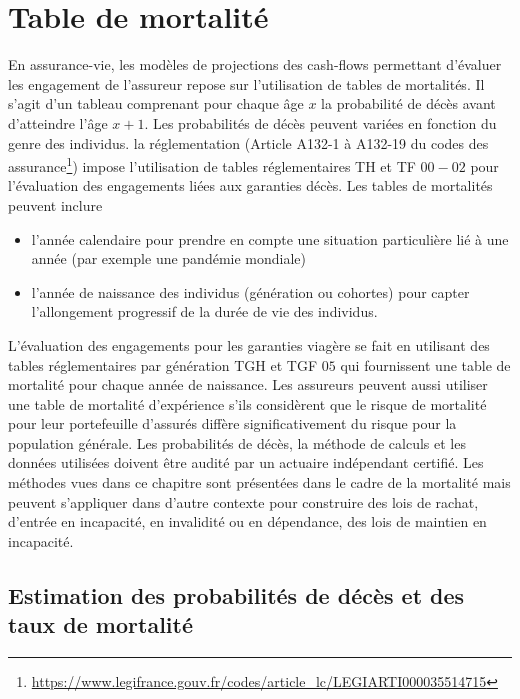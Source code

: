 \chapter{Table de mortalité}\label{chap:mortality_table}

En assurance-vie, les modèles de projections des cash-flows permettant d'évaluer les engagement de l'assureur repose sur l'utilisation de tables de mortalités. Il s'agit d'un tableau comprenant pour chaque âge $x$ la probabilité de décès avant d'atteindre l'âge $x+1$. Les probabilités de décès peuvent variées en fonction du genre des individus. la réglementation (Article A132-1 à A132-19 du codes des assurance\footnote{\url{https://www.legifrance.gouv.fr/codes/article_lc/LEGIARTI000035514715}}) impose l'utilisation de tables réglementaires TH et TF $00-02$ pour l'évaluation des engagements liées aux garanties décès. Les tables de mortalités peuvent inclure 
\begin{itemize}
\item l'année calendaire pour prendre en compte une situation particulière lié à une année (par exemple une pandémie mondiale)
\item l'année de naissance des individus (génération ou cohortes) pour capter l'allongement progressif de la durée de vie des individus. 
\end{itemize}
L'évaluation des engagements pour les garanties viagère se fait en utilisant des tables réglementaires par génération TGH et TGF $05$ qui fournissent une table de mortalité pour chaque année de naissance. Les assureurs peuvent aussi utiliser une table de mortalité d'expérience s'ils considèrent que le risque de mortalité pour leur portefeuille d'assurés diffère significativement du risque pour la population générale. Les probabilités de décès, la méthode de calculs et les données utilisées doivent être audité par un actuaire indépendant certifié. Les méthodes vues dans ce chapitre sont présentées dans le cadre de la mortalité mais peuvent s'appliquer dans d'autre contexte pour construire des lois de rachat, d'entrée en incapacité, en invalidité ou en dépendance, des lois de maintien en incapacité.
\section{Estimation des probabilités de décès et des taux de mortalité}\label{sec:mortality_rate}
